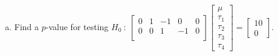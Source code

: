 \documentclass[paper=a4, fontsize=11pt]{scrartcl} %
\begin{document}
\begin{enumerate}[(a)]
\item Find a $p$-value for testing $H_0 \ : \ 
\begin{bmatrix} 0 & 1 & -1 & 0 & 0 \\
                             0 & 0 & 1 & -1 & 0 \\
\end{bmatrix}
\begin{bmatrix} \mu\\
                             \tau_1\\
                             \tau_2\\
                             \tau_3\\
                             \tau_4
\end{bmatrix}
=
\begin{bmatrix} 10\\
                             0
\end{bmatrix}
$. 
\end{enumerate}
\bigskip
\end{document}
